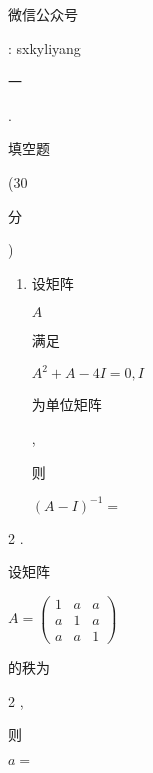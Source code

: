\documentclass[10pt]{article}
\begin{document}
\begin{CJK}{UTF8}{mj}微信公众号\end{CJK}: sxkyliyang

\begin{CJK}{UTF8}{mj}一\end{CJK}. \begin{CJK}{UTF8}{mj}填空题\end{CJK} (30 \begin{CJK}{UTF8}{mj}分\end{CJK})

\begin{enumerate}
  \item \begin{CJK}{UTF8}{mj}设矩阵\end{CJK} $A$ \begin{CJK}{UTF8}{mj}满足\end{CJK} $A^{2}+A-4 I=0, I$ \begin{CJK}{UTF8}{mj}为单位矩阵\end{CJK}, \begin{CJK}{UTF8}{mj}则\end{CJK} $(A-I)^{-1}=$
\end{enumerate}
2 . \begin{CJK}{UTF8}{mj}设矩阵\end{CJK} $A=\left(\begin{array}{lll}1 & a & a \\ a & 1 & a \\ a & a & 1\end{array}\right)$ \begin{CJK}{UTF8}{mj}的秩为\end{CJK} 2 , \begin{CJK}{UTF8}{mj}则\end{CJK} $a=$
\end{document}
